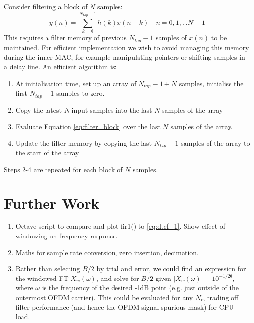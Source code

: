 \documentclass{article}
\begin{document}
Consider filtering a block of $N$ samples:
\begin{equation} \label{eq:filter_block}
y(n) = \sum_{k=0}^{N_{tap}-1} h(k) x(n-k) \quad n=0,1, \ldots N-1
\end{equation}
This requires a filter memory of previous $N_{tap}-1$ samples of $x(n)$ to be maintained.  For efficient implementation we wish to avoid managing this memory during the inner MAC, for example manipulating pointers or shifting samples in a delay line. An efficient algorithm is:
\begin{enumerate}
\item At initialisation time, set up an array of $N_{tap}-1+N$ samples, initialise the first $N_{tap}-1$ samples to zero.
\item Copy the latest $N$ input samples into the last $N$ samples of the array
\item Evaluate Equation \ref{eq:filter_block} over the last $N$ samples of the array.
\item Update the filter memory by copying the last $N_{tap}-1$ samples of the array to the start of the array
\end{enumerate}
Steps 2-4 are repeated for each block of $N$ samples.

\section {Further Work}

\begin{enumerate}

\item Octave script to compare and plot fir1() to \ref{eq:dtcf_1}. Show effect of windowing on frequency response.

\item Maths for sample rate conversion, zero insertion, decimation.

\item Rather than selecting $B/2$ by trial and error, we could find an expression for the windowed FT $X_w(\omega)$, and solve for $B/2$ given $|X_w(\omega)|=10^{-1/20}$, where $\omega$ is the frequency of the desired -1dB point (e.g. just outside of the outermost OFDM carrier).  This could be evaluated for any $N_t$, trading off filter performance (and hence the OFDM signal spurious mask) for CPU load.  

\end{enumerate}



\end{document}

